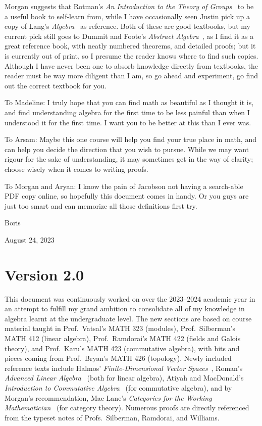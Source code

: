 Morgan suggests that Rotman's \textit{An Introduction to the Theory of Groups}~\cite{rotman}
to be a useful book to self-learn from,
while I have occasionally seen Justin
pick up a copy of Lang's \textit{Algebra}~\cite{lang} as reference.
Both of these are good textbooks,
but my current pick still goes to Dummit and Foote's \textit{Abstract Algebra}~\cite{dummitfoote},
as I find it as a great reference book,
with neatly numbered theorems, and detailed proofs;
but it is currently out of print,
so I presume the reader knows where to find such copies.
Although I have never been one to absorb knowledge directly from textbooks,
the reader must be way more diligent than I am,
so go ahead and experiment,
go find out the correct textbook for you.

\medskip

To Madeline:
I truly hope that you can find math as beautiful as I thought it is,
and find understanding algebra for the first time
to be less painful than when I understood it for the first time.
I want you to be better at this than I ever was.

To Arsam:
Maybe this one course will help you find your true place in math,
and can help you decide the direction that you wish to pursue.
While we may want rigour for the sake of understanding,
it may sometimes get in the way of clarity;
choose wisely when it comes to writing proofs.

To Morgan and Aryan:
I know the pain of
Jacobson not having a search-able PDF copy online,
so hopefully this document comes in handy.
Or you guys are just too smart
and can memorize all those definitions first try.

\medskip

Boris

August 24, 2023

\section*{Version 2.0}

This document was continuously worked on
over the 2023--2024 academic year
in an attempt to fulfill my grand ambition
to consolidate all of my knowledge in algebra
learnt at the undergraduate level.
The new sections are based on course material taught in
Prof.\ Vatsal's MATH 323 (modules),
Prof.\ Silberman's MATH 412 (linear algebra),
Prof.\ Ramdorai's MATH 422 (fields and Galois theory),
and Prof.\ Karu's MATH 423 (commutative algebra),
with bits and pieces coming from Prof.\ Bryan's MATH 426 (topology).
Newly included reference texts include
Halmos' \textit{Finite-Dimensional Vector Spaces}~\cite{halmos},
Roman's \textit{Advanced Linear Algebra}~\cite{roman} (both for linear algebra),
Atiyah and MacDonald's \textit{Introduction to Commutative Algebra}~\cite{atiyahmacdonald} (for commutative algebra),
and by Morgan's recommendation,
Mac Lane's \textit{Categories for the Working Mathematician}~\cite{maclane} (for category theory).
Numerous proofs are directly referenced from the typeset notes of
Profs.\ Silberman, Ramdorai, and Williams.


